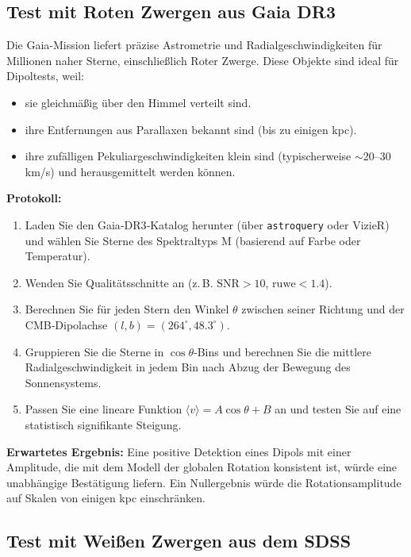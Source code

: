 \documentclass[11pt,a4paper]{article}
\begin{document}
	\subsection{Test mit Roten Zwergen aus Gaia DR3}
	
	Die Gaia‑Mission liefert präzise Astrometrie und Radialgeschwindigkeiten für Millionen naher Sterne, einschließlich Roter Zwerge. Diese Objekte sind ideal für Dipoltests, weil:
	\begin{itemize}
		\item sie gleichmäßig über den Himmel verteilt sind.
		\item ihre Entfernungen aus Parallaxen bekannt sind (bis zu einigen kpc).
		\item ihre zufälligen Pekuliargeschwindigkeiten klein sind (typischerweise \(\sim\)20–30 km/s) und herausgemittelt werden können.
	\end{itemize}
	
	\textbf{Protokoll:}
	\begin{enumerate}
		\item Laden Sie den Gaia‑DR3‑Katalog herunter (über \texttt{astroquery} oder VizieR) und wählen Sie Sterne des Spektraltyps M (basierend auf Farbe oder Temperatur).
		\item Wenden Sie Qualitätsschnitte an (z. B. \(\mathrm{SNR} > 10\), \(\mathrm{ruwe} < 1.4\)).
		\item Berechnen Sie für jeden Stern den Winkel \(\theta\) zwischen seiner Richtung und der CMB‑Dipolachse \((l,b) = (264^\circ, 48.3^\circ)\).
		\item Gruppieren Sie die Sterne in \(\cos\theta\)‑Bins und berechnen Sie die mittlere Radialgeschwindigkeit in jedem Bin nach Abzug der Bewegung des Sonnensystems.
		\item Passen Sie eine lineare Funktion \(\langle v \rangle = A \cos\theta + B\) an und testen Sie auf eine statistisch signifikante Steigung.
	\end{enumerate}
	
	\textbf{Erwartetes Ergebnis:} Eine positive Detektion eines Dipols mit einer Amplitude, die mit dem Modell der globalen Rotation konsistent ist, würde eine unabhängige Bestätigung liefern. Ein Nullergebnis würde die Rotationsamplitude auf Skalen von einigen kpc einschränken.
	
	\subsection{Test mit Weißen Zwergen aus dem SDSS}
	
\end{document}
